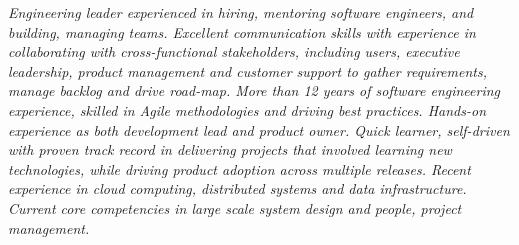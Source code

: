 {\selectfont
\begin{justify}\textit{Engineering leader experienced in hiring, mentoring software engineers, and building, managing teams. Excellent communication skills with experience in collaborating with cross-functional stakeholders, including users, executive leadership, product management and customer support to gather requirements, manage backlog and drive road-map. More than 12 years of software engineering experience, skilled in Agile methodologies and driving best practices. Hands-on experience as both development lead and product owner. Quick learner, self-driven with proven track record in delivering projects that involved learning new technologies, while driving product adoption across multiple releases. Recent experience in cloud computing, distributed systems and data infrastructure. Current core competencies in large scale system design and people, project management.}\end{justify}
}